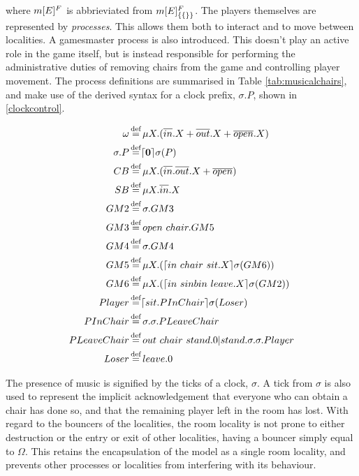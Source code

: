 \noindent where ${m}[ E ]^{F}$ is abbrieviated from
${m}[ E ]^{F}_{\{\{\}\}}$.  The players themselves are represented by
\emph{processes}.  This allows them both to interact and to move between
localities.  A gamesmaster process is also introduced.  This doesn't
play an active role in the game itself, but is instead responsible for
performing the administrative duties of removing chairs from the game
and controlling player movement.  The process definitions are summarised
in Table \ref{tab:musicalchairs}, and make use of the derived syntax for
a clock prefix, $\sigma.P$, shown in \ref{clockcontrol}.

\begin{table}[h]
  \caption{Summary of Processes and Derived Syntax for Musical Chairs}
  \label{tab:musicalchairs}
  \shrule
  \begin{align}
   \omega &
     \operatorname{\stackrel{\textrm{def}}{=}} 
     \mu X.(\overline{in}.X + \overline{out}.X + \overline{open}.X) \label{o}\\
   \sigma.P &
     \operatorname{\stackrel{\textrm{def}}{=}} 
     \lceil{\textbf{0}}\rceil {\sigma} ({P}) \label{clockpref} \\
   CB &
    \operatorname{\stackrel{\textrm{def}}{=}} 
    \mu X.(\overline{in}.\overline{out}.X + \overline{open}) \label{chairb} \\
   SB &
    \operatorname{\stackrel{\textrm{def}}{=}} 
    \mu X.\overline{in}.X \label{sinb} \\
   GM2 &
    \operatorname{\stackrel{\textrm{def}}{=}} 
    \sigma.GM3 \label{gmstage2} \\
    GM3 &
    \operatorname{\stackrel{\textrm{def}}{=}} 
    open\ chair.GM5 \label{gmstage3} \\
   GM4 &
   \operatorname{\stackrel{\textrm{def}}{=}}
   \sigma.GM4 \label{gmstage4} \\
   GM5 &
    \operatorname{\stackrel{\textrm{def}}{=}}  
    \mu X.(\lceil{in\ chair\ sit.X}\rceil {\sigma} ({GM6})) \label{gmstage5} \\
   GM6 &
    \operatorname{\stackrel{\textrm{def}}{=}} 
    \mu X.(\lceil{in\ sinbin\ leave.X}\rceil {\sigma} ({GM2})) \label{gmstage6}\\
    Player &
    \operatorname{\stackrel{\textrm{def}}{=}} 
    \lceil{sit.PInChair}\rceil {\sigma} ({Loser}) \label{player}\\
   PInChair &
    \operatorname{\stackrel{\textrm{def}}{=}} 
    \sigma.\sigma.PLeaveChair \label{pinchair} \\
   PLeaveChair &
   \operatorname{\stackrel{\textrm{def}}{=}}
   out\ chair\ stand.0|stand.\sigma.\sigma.Player \label{pleavechair} \\
   Loser &
    \operatorname{\stackrel{\textrm{def}}{=}} 
    leave.0 \label{loser} 
  \end{align}
  \shrule
\end{table}

The presence of music is signified by the ticks of a clock, $\sigma$.  A
tick from $\sigma$ is also used to represent the implicit
acknowledgement that everyone who can obtain a chair has done so, and
that the remaining player left in the room has lost.  With regard to the
bouncers of the localities, the room locality is not prone to either
destruction or the entry or exit of other localities, having a bouncer
simply equal to $\Omega$.  This retains the encapsulation of the model
as a single room locality, and prevents other processes or localities
from interfering with its behaviour.

